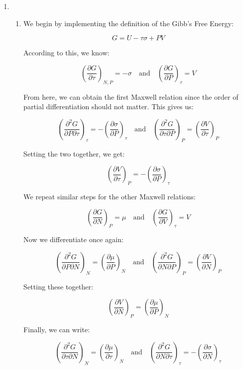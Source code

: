 \begin{enumerate}

  \item

    \begin{enumerate}

      \item 

        We begin by implementing the definition of the Gibb's Free Energy:

        $$G=U-\tau\sigma+PV$$

        According to this, we know:

        $$\left( \frac{\partial G}{\partial \tau} \right)_{N,P}=-\sigma\quad\text{and}\quad\left( \frac{\partial G}{\partial P} \right)_\tau=V$$

        From here, we can obtain the first Maxwell relation since the order of partial differentiation should not matter. This gives us:

        $$\left( \frac{\partial ^2G}{\partial P\partial \tau} \right)_{\tau}=-\left(\frac{\partial \sigma}{\partial P}\right)_\tau\quad\text{and}\quad \left( \frac{\partial^2 G}{\partial\tau\partial P} \right)_P=\left( \frac{\partial V}{\partial \tau} \right)_P$$

        Setting the two together, we get:

        $$\boxed{\left(  \frac{\partial V}{\partial \tau}\right)_P=-\left( \frac{\partial\sigma}{\partial P} \right)_\tau}$$

        We repeat similar steps for the other Maxwell relations:

        $$\left( \frac{\partial G}{\partial N} \right)_P=\mu\quad\text{and}\quad\left( \frac{\partial G}{\partial V} \right)_\tau=V$$

        Now we differentiate once again:

        $$\left( \frac{\partial^2G}{\partial P\partial N} \right)_N=\left( \frac{\partial\mu}{\partial P} \right)_N\quad\text{and}\quad\left( \frac{\partial^2G}{\partial N\partial P} \right)_P=\left( \frac{\partial V}{\partial N} \right)_P$$

        Setting these together:

        $$\boxed{\left(  \frac{\partial V}{\partial N}\right)_P=\left( \frac{\partial\mu}{\partial P} \right)_N}$$

        Finally, we can write:

        $$\left( \frac{\partial^2G}{\partial \tau\partial N} \right)_N=\left( \frac{\partial\mu}{\partial \tau} \right)_N\quad\text{and}\quad\left( \frac{\partial^2G}{\partial N\partial \tau} \right)_\tau=-\left( \frac{\partial \sigma}{\partial N} \right)_\tau$$


\end{enumerate}
\end{enumerate}
